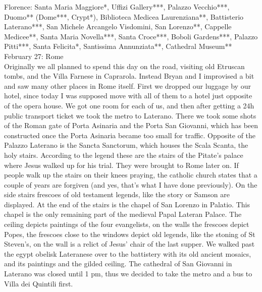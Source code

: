 Florence: Santa Maria Maggiore*, Uffizi Gallery***, Palazzo Vecchio***, Duomo** (Dome***, Crypt*), Biblioteca Medicea Laurenziana**, Battisterio Laterano***, San Michele Arcangelo Visdomini, San Lorenzo**, Cappelle Medicee**, Santa Maria Novella***, Santa Croce***, Boboli Gardens***, Palazzo Pitti***, Santa Felicita*, Santissima Annunziata**, Cathedral Museum**\\%

February 27: Rome\\%
Originally we all planned to spend this day on the road, visiting old Etruscan tombs, and the Villa Farnese in Caprarola. Instead Bryan and I improvised a bit and saw many other places in Rome itself. First we dropped our luggage by our hotel, since today I was supposed move with all of them to a hotel just opposite of the opera house. We got one room for each of us, and then after getting a 24h public transport ticket we took the metro to Laterano. There we took some shots of the Roman gate of Porta Asinaria and the Porta San Giovanni, which has been constructed once the Porta Asinaria became too small for traffic. Opposite of the Palazzo Laterano is the Sancta Sanctorum, which houses the Scala Scanta, the holy stairs. According to the legend these are the stairs of the Pitate's palace where Jesus walked up for his trial. They were brought to Rome later on. If people walk up the stairs on their knees praying, the catholic church states that a couple of years are forgiven (and yes, that's what I have done previously). On the side stairs frescoes of old testament legends, like the story or Samson are displayed. At the end of the stairs is the chapel of San Lorenzo in Palatio. This chapel is the only remaining part of the medieval Papal Lateran Palace. The ceiling depicts paintings of the four evangelists, on the walls the frescoes depict Popes, the frescoes close to the windows depict old legends, like the stoning of St Steven's, on the wall is a relict of Jesus' chair of the last supper. We walked past the egypt obelisk Lateranese over to the battistery with its old ancient mosaics, and its paintings and the gilded ceiling. The cathedral of San Giovanni in Laterano was closed until 1 pm, thus we decided to take the metro and a bus to Villa dei Quintili first.\\
